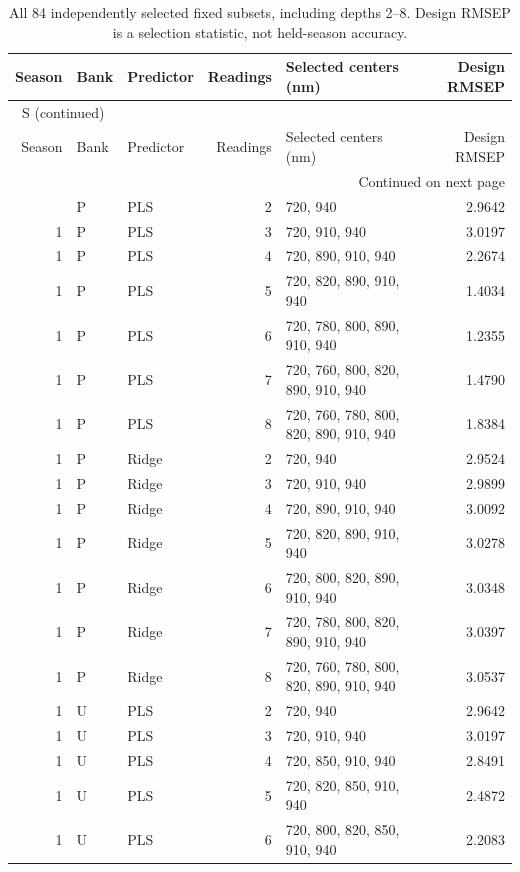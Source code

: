 \documentclass[10pt,a4paper]{article}
\renewcommand{\thetable}{S\arabic{table}}
\begin{document}
\begingroup\footnotesize
\setlength{\tabcolsep}{3.5pt}
\renewcommand{\arraystretch}{1.10}
\begin{longtable}{rllrlr}
\caption{All 84 independently selected fixed subsets, including depths 2--8. Design RMSEP is a selection statistic, not held-season accuracy.}\label{tab:subsets}\\
\toprule
Season & Bank & Predictor & Readings & Selected centers (nm) & Design RMSEP \\
\midrule
\endfirsthead
\multicolumn{6}{l}{\tablename~\thetable{} (continued)}\\
\toprule
Season & Bank & Predictor & Readings & Selected centers (nm) & Design RMSEP \\
\midrule
\endhead
\midrule
\multicolumn{6}{r}{Continued on next page}\\
\endfoot
\bottomrule
\endlastfoot
1 & P & PLS & 2 & 720, 940 & 2.9642 \\
1 & P & PLS & 3 & 720, 910, 940 & 3.0197 \\
1 & P & PLS & 4 & 720, 890, 910, 940 & 2.2674 \\
1 & P & PLS & 5 & 720, 820, 890, 910, 940 & 1.4034 \\
1 & P & PLS & 6 & 720, 780, 800, 890, 910, 940 & 1.2355 \\
1 & P & PLS & 7 & 720, 760, 800, 820, 890, 910, 940 & 1.4790 \\
1 & P & PLS & 8 & 720, 760, 780, 800, 820, 890, 910, 940 & 1.8384 \\
1 & P & Ridge & 2 & 720, 940 & 2.9524 \\
1 & P & Ridge & 3 & 720, 910, 940 & 2.9899 \\
1 & P & Ridge & 4 & 720, 890, 910, 940 & 3.0092 \\
1 & P & Ridge & 5 & 720, 820, 890, 910, 940 & 3.0278 \\
1 & P & Ridge & 6 & 720, 800, 820, 890, 910, 940 & 3.0348 \\
1 & P & Ridge & 7 & 720, 780, 800, 820, 890, 910, 940 & 3.0397 \\
1 & P & Ridge & 8 & 720, 760, 780, 800, 820, 890, 910, 940 & 3.0537 \\
1 & U & PLS & 2 & 720, 940 & 2.9642 \\
1 & U & PLS & 3 & 720, 910, 940 & 3.0197 \\
1 & U & PLS & 4 & 720, 850, 910, 940 & 2.8491 \\
1 & U & PLS & 5 & 720, 820, 850, 910, 940 & 2.4872 \\
1 & U & PLS & 6 & 720, 800, 820, 850, 910, 940 & 2.2083 \\

\end{longtable}
\end{document}
